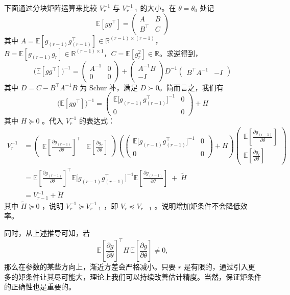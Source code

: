 下面通过分块矩阵运算来比较 $V_r^{-1}$ 与 $V_{r-1}^{-1}$ 的大小。在 $\theta=\theta_0$ 处记
\[\mathbb{E}[g g^\top] = \begin{pmatrix} A & B \\ B^\top & C \end{pmatrix}\]
其中 $A = \mathbb{E}[g_{(r-1)} g_{(r-1)}^\top] \in \mathbb{R}^{(r-1)\times(r-1)}$，$B = \mathbb{E}[g_{(r-1)} g_r] \in \mathbb{R}^{(r-1)\times 1}$，$C = \mathbb{E}[g_r^2] \in \mathbb{R}$。求逆得到，
\[\bigl(\mathbb{E}[g g^\top]\bigr)^{-1} =\begin{pmatrix} A^{-1} & 0 \\ 0 & 0 \end{pmatrix} +  \begin{pmatrix} A^{-1}B \\ -I \end{pmatrix} D^{-1} \begin{pmatrix} B^\top A^{-1} & -I \end{pmatrix}\]
其中 $D = C - B^\top A^{-1} B$ 为 Schur 补，满足 $D \succ 0$。简而言之，我们有
\[\bigl(\mathbb{E}[g g^\top]\bigr)^{-1} =\begin{pmatrix}\mathbb{E}\big[g_{(r-1)}g_{(r-1)}^\top\big]^{-1}&0\\0&0\end{pmatrix}+H\]
其中 $H\succeq 0$ 。代入 $V_{r}^{-1}$ 的表达式：
\[\begin{aligned} V_{r}^{-1} &= \begin{pmatrix} \mathbb{E}\!\left[\frac{\partial g_{(r-1)}}{\partial\theta}\right]^{\top} & \mathbb{E}\!\left[\frac{\partial g_{r}}{\partial\theta}\right] \end{pmatrix} \left(\begin{pmatrix}\mathbb{E}\big[g_{(r-1)}g_{(r-1)}^\top\big]^{-1}&0\\0&0\end{pmatrix}+H\right) \begin{pmatrix} \mathbb{E}\!\left[\frac{\partial g_{(r-1)}}{\partial\theta}\right] \\ \mathbb{E}\!\left[\frac{\partial g_{r}}{\partial\theta}\right] \end{pmatrix} \\ &= \mathbb{E}\!\left[\frac{\partial g_{(r-1)}}{\partial\theta}\right]^{\top} \mathbb{E}\big[g_{(r-1)}g_{(r-1)}^\top\big]^{-1}\mathbb{E}\!\left[\frac{\partial g_{(r-1)}}{\partial\theta}\right] \;+\; \widetilde H\\ &=V_{r-1}^{-1}+\widetilde H \end{aligned}\]
其中 $\widetilde H\succeq 0$ ，说明 $V_r^{-1}\succeq V_{r-1}^{-1}$ ，即 $V_r\preceq V_{r-1}$ 。说明增加矩条件不会降低效率。

同时，从上述推导可知，若
\[\mathbb{E}\!\left[\frac{\partial g}{\partial\theta}\right]^{\top} H \, \mathbb{E}\!\left[\frac{\partial g}{\partial\theta}\right] \neq 0,\]
那么在参数的某些方向上，渐近方差会严格减小。只要 $r$ 是有限的，通过引入更多的矩条件让其尽可能大，理论上我们可以持续改善估计精度。当然，保证矩条件的正确性也是重要的。

